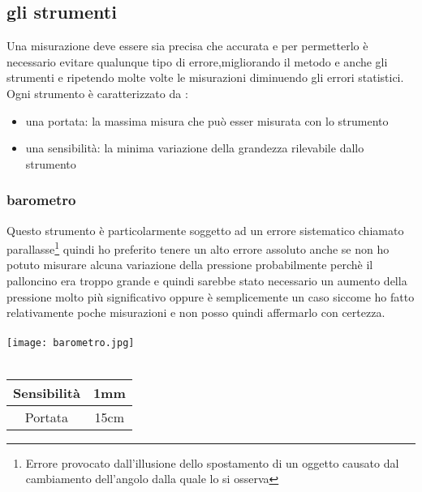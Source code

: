 \documentclass[12pt]{article}
\begin{document}
\subsection{gli strumenti}
Una misurazione deve essere sia precisa che accurata e per permetterlo è necessario evitare qualunque tipo di errore,migliorando il metodo e anche gli strumenti e ripetendo molte volte le misurazioni diminuendo gli errori statistici.
Ogni strumento è caratterizzato da :
\begin{itemize}
    \item una portata: la massima misura che può esser misurata con lo strumento
    \item una sensibilità: la minima variazione della grandezza rilevabile dallo strumento
\end{itemize}
\vspace{2cm}
\subsubsection{barometro}
Questo strumento è particolarmente soggetto ad un errore sistematico chiamato parallasse\footnote{Errore provocato dall'illusione dello spostamento di un oggetto causato dal cambiamento dell'angolo dalla quale lo si osserva} quindi ho preferito tenere un alto errore assoluto anche se non ho potuto misurare alcuna variazione della pressione probabilmente perchè il palloncino era troppo grande e quindi sarebbe stato necessario un aumento della pressione molto più significativo oppure è semplicemente un caso siccome ho fatto relativamente poche misurazioni e non posso quindi affermarlo con certezza.\\ \\
    \texttt{[image: barometro.jpg]} \\ \\
   \begin{tabular}{|c|S|}
    \hline
    Sensibilità & 1mm \\
    \hline
    Portata & 15cm\\
    \hline
\end{tabular}
\end{document}
